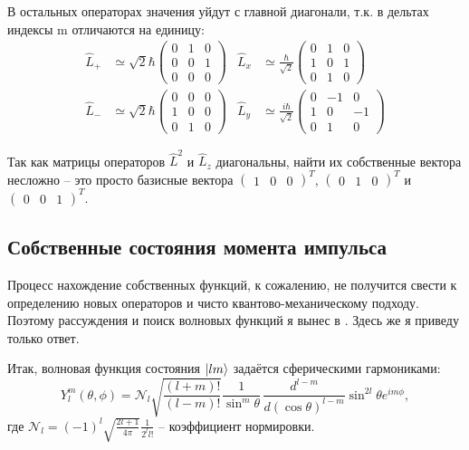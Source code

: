 В остальных операторах значения уйдут с главной диагонали, т.к. в дельтах индексы m отличаются на единицу:
\begin{align*}
    \hat{L}_+ &\simeq \sqrt{2} \hbar \begin{pmatrix}
        0 & 1 & 0 \\ 0 & 0 & 1 \\ 0 & 0 & 0
    \end{pmatrix} &
    \hat{L}_x &\simeq \frac{\hbar}{\sqrt{2}} \begin{pmatrix}
        0 & 1 & 0 \\ 1 & 0 & 1 \\ 0 & 1 & 0
    \end{pmatrix} \\
    \hat{L}_- &\simeq \sqrt{2} \hbar \begin{pmatrix}
        0 & 0 & 0 \\ 1 & 0 & 0 \\ 0 & 1 & 0
    \end{pmatrix} &
    \hat{L}_y &\simeq \frac{i\hbar}{\sqrt{2}} \begin{pmatrix}
        0 & -1 & 0 \\ 1 & 0 & -1 \\ 0 & 1 & 0
    \end{pmatrix}
\end{align*}

Так как матрицы операторов $\hat{L}^2$ и $\hat{L}_z$ диагональны, найти их собственные вектора несложно -- это просто базисные вектора $\begin{pmatrix} 1 & 0 & 0 \end{pmatrix}^T$, $\begin{pmatrix} 0 & 1 & 0 \end{pmatrix}^T$ и $\begin{pmatrix} 0 & 0 & 1 \end{pmatrix}^T$. 

\subsection{Собственные состояния момента импульса}
\hspace{1em} Процесс нахождение собственных функций, к сожалению, не получится свести к определению новых операторов и чисто квантово-механическому подходу. Поэтому рассуждения и поиск волновых функций я вынес в . Здесь же я приведу только ответ.

Итак, волновая функция состояния $\ket{lm}$ задаётся сферическими гармониками:
\[
Y^m_l(\theta, \phi) = \mathcal{N}_l\sqrt{\frac{(l+m)!}{(l-m)!}} \frac{1}{\sin^{m}\theta}\,\frac{d^{l-m}}{d(\cos\theta)^{l-m}}\sin^{2l}\theta e^{im\phi},
\]
где $\mathcal{N}_l = (-1)^l \sqrt{\frac{2l+1}{4\pi}}\frac{1}{2^l l!}$ -- коэффициент нормировки.

